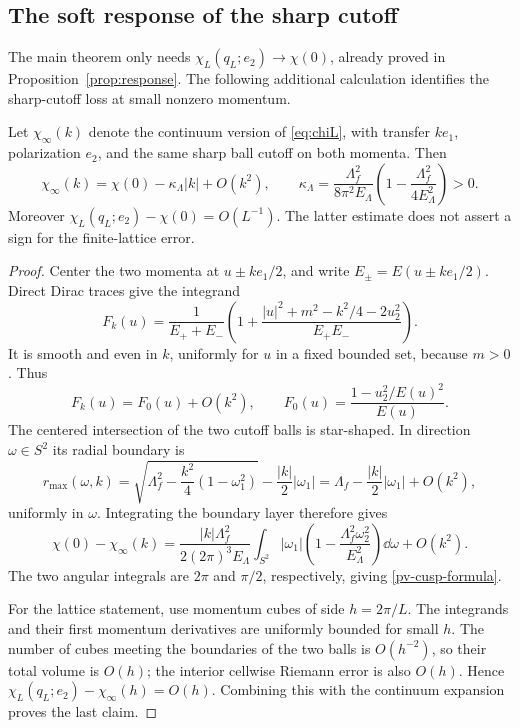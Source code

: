 \subsection{The soft response of the sharp cutoff}

The main theorem only needs \(\chi_L(q_L;e_2)\to\chi(0)\), already
proved in Proposition~\ref{prop:response}. The following additional
calculation identifies the sharp-cutoff loss at small nonzero momentum.

\begin{lemma}
\label{pv-cusp}
Let \(\chi_\infty(k)\) denote the continuum version of
\eqref{eq:chiL}, with transfer \(ke_1\), polarization \(e_2\), and the
same sharp ball cutoff on both momenta. Then
\begin{equation}
 \chi_\infty(k)=\chi(0)-\kappa_\Lambda|k|+O(k^2),\qquad
 \kappa_\Lambda=
 \frac{\Lambda_f^2}{8\pi^2E_\Lambda}
 \left(1-\frac{\Lambda_f^2}{4E_\Lambda^2}\right)>0.
 \label{pv-cusp-formula}
\end{equation}
Moreover \(\chi_L(q_L;e_2)-\chi(0)=O(L^{-1})\).
The latter estimate does not assert a sign for the finite-lattice error.
\end{lemma}
\begin{proof}
Center the two momenta at \(u\pm ke_1/2\), and write
\(E_\pm=E(u\pm ke_1/2)\). Direct Dirac traces give the integrand
\[
 F_k(u)=\frac{1}{E_++E_-}
 \left(1+
 \frac{|u|^2+m^2-k^2/4-2u_2^2}{E_+E_-}\right).
\]
It is smooth and even in \(k\), uniformly for \(u\) in a fixed bounded
set, because \(m>0\). Thus
\[
 F_k(u)=F_0(u)+O(k^2),\qquad
 F_0(u)=\frac{1-u_2^2/E(u)^2}{E(u)}.
\]
The centered intersection of the two cutoff balls is star-shaped. In
direction \(\omega\in S^2\) its radial boundary is
\[
 r_{\max}(\omega,k)
 =\sqrt{\Lambda_f^2-\frac{k^2}{4}(1-\omega_1^2)}
     -\frac{|k|}{2}|\omega_1|
 =\Lambda_f-\frac{|k|}{2}|\omega_1|+O(k^2),
\]
uniformly in \(\omega\). Integrating the boundary layer therefore gives
\[
 \chi(0)-\chi_\infty(k)
 =\frac{|k|\Lambda_f^2}{2(2\pi)^3E_\Lambda}
 \int_{S^2}|\omega_1|
     \left(1-\frac{\Lambda_f^2\omega_2^2}{E_\Lambda^2}\right)\dd\omega
 +O(k^2).
\]
The two angular integrals are \(2\pi\) and \(\pi/2\), respectively,
giving \eqref{pv-cusp-formula}.

For the lattice statement, use momentum cubes of side \(h=2\pi/L\).
The integrands and their first momentum derivatives are uniformly bounded
for small \(h\). The number of cubes meeting the boundaries of the two
balls is \(O(h^{-2})\), so their total volume is \(O(h)\); the interior
cellwise Riemann error is also \(O(h)\). Hence
\(\chi_L(q_L;e_2)-\chi_\infty(h)=O(h)\). Combining this with the
continuum expansion proves the last claim.
\end{proof}

